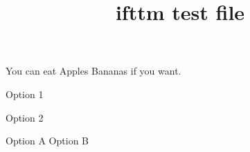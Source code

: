 \documentclass[12pt]{article}
\title{ifttm test file}
\begin{document}

You can eat \ifttm Apples \else Bananas \fi if you want.


\ifttm

  Option 1

\else

  Option 2

\fi


\ifttm
  Option A
\else
  Option B
\fi
\end{document}
